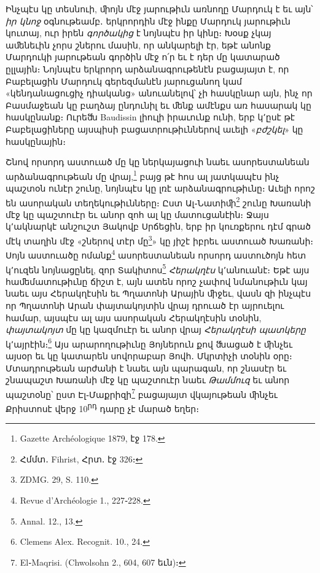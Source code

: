 \documentclass{article}
\begin{document}
{Ինչպէս կը տեսնուի, ﬕոյն մէջ յարութիւն առնողը Մարդուկ է եւ այն՝ \emph{իր կնոջ} օգնութեամբ․ երկրորդին մէջ ինքը Մարդուկ յարութիւն կուտայ, ուր իրեն \emph{գործակից} է նոյնպէս իր կինը։ Խօսք չկայ աﬔնեւին չորս շներու մասին, որ անկարելի էր, եթէ անոնք Մարդուկի յարութեան գործին մէջ ո՛ր եւ է դեր մը կատարած ըլլային։ Նոյնպէս երկրորդ արձանագրութենէն բացայայտ է, որ Բաբելացին Մարդուկ գերեզմանէն յարուցանող կամ «կենդանացուցիչ դիականց» անուանելով՝ չի հասկընար այն, ինչ որ Բասմաջեան կը բաղձայ ընդունիլ եւ ﬔնք ամէնքս առ հասարակ կը հասկընանք։ Ուրեﬓ Baudissin լիուլի իրաւունք ունի, երբ կ՚ըսէ թէ Բաբելացիները այսպիսի բացատրութիւններով աւելի «\emph{բժշկել}» կը հասկընային։

Շնով որսորդ աստուած մը կը ներկայացուի նաեւ ասորեստանեան արձանագրութեան մը վրայ,\footnote{Gazette Archéologique 1879, էջ 178.} բայց թէ հոս ալ յատկապէս ինչ պաշտօն ունէր շունը, նոյնպէս կը լռէ արձանագրութիւնը։ Աւելի որոշ են ասորական տեղեկութիւնները։ Ըստ Ալ֊Նատիﬕ\footnote{Հմմտ․ Fihrist, Հրտ․ էջ 326։} շունը Խառանի մէջ կը պաշտուէր եւ անոր զոհ ալ կը մատուցանէին։ Ջայս կ՚ակնարկէ անշուշտ Յակովբ Սրճեցին, երբ իր կուռքերու դէմ գրած մէկ տաղին մէջ «շներով տէր մը\footnote{ZDMG. 29, S. 110.}» կը յիշէ իբրեւ աստուած Խառանի։ Սոյն աստուածը ոմանք\footnote{Revue d'Archéologie 1., 227֊228.} ասորեստանեան որսորդ աստուծոյն հետ կ՚ուզեն նոյնացընել, զոր Տակիտոս\footnote{Annal. 12., 13.} \emph{Հերակղէս} կ՚անուանէ։ Եթէ այս հաﬔմատութիւնը ճիշտ է, այն ատեն որոշ չափով նմանութիւն կայ նաեւ այս Հերակղէսին եւ Պղատոնի Արային ﬕջեւ, վասն զի ինչպէս որ Պղատոնի Արան փայտակոյտին վրայ դրուած էր այրուելու համար, այսպէս ալ այս ասորական Հերակղէսին տօնին, \emph{փայտակոյտ} մը կը կազմուէր եւ անոր վրայ \emph{Հերակղէսի պատկերը} կ՚այրէին։\footnote{Clemens Alex. Recognit. 10., 24.} Այս արարողութիւնը Յոյներուն քով ﬓացած է ﬕնչեւ այսօր եւ կը կատարեն սովորաբար Յովհ․ Մկրտիչի տօնին օրը։ Մտադրութեան արժանի է նաեւ այն պարագան, որ շնասէր եւ շնապաշտ Խառանի մէջ կը պաշտուէր նաեւ \emph{Թամմուզ} եւ անոր պաշտօնը՝ ըստ Էլ֊Մաքրիզի\footnote{El֊Maqrisi. (Chwolsohn 2., 604, 607 եւն)։} բացայայտ վկայութեան ﬕնչեւ Քրիստոսէ վերջ 10\textsuperscript{րդ} դարը չէ մարած եղեր։

}
\end{document}
